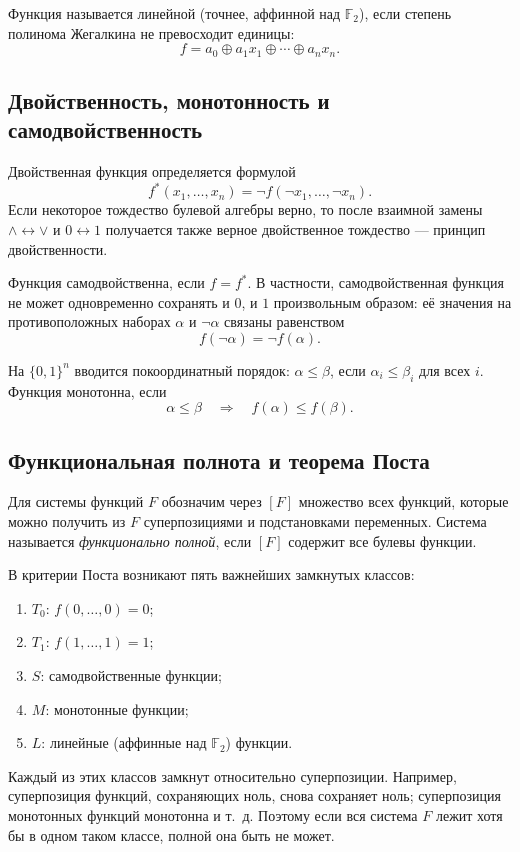 Функция называется линейной (точнее, аффинной над $\mathbb F_2$), если степень
полинома Жегалкина не превосходит единицы:
\[
 f=a_0\oplus a_1x_1\oplus\cdots\oplus a_nx_n.
\]

\subsection{Двойственность, монотонность и самодвойственность}

Двойственная функция определяется формулой
\[
 f^*(x_1,\ldots,x_n)=\neg f(\neg x_1,\ldots,\neg x_n).
\]
Если некоторое тождество булевой алгебры верно, то после взаимной замены
$\land\leftrightarrow\lor$ и $0\leftrightarrow1$ получается также верное
двойственное тождество --- принцип двойственности.

Функция самодвойственна, если $f=f^*$. В частности, самодвойственная функция не
может одновременно сохранять и $0$, и $1$ произвольным образом: её значения на
противоположных наборах $\alpha$ и $\neg\alpha$ связаны равенством
\[
 f(\neg\alpha)=\neg f(\alpha).
\]

На $\{0,1\}^n$ вводится покоординатный порядок:
$\alpha\le\beta$, если $\alpha_i\le\beta_i$ для всех $i$. Функция монотонна,
если
\[
 \alpha\le\beta\quad\Longrightarrow\quad f(\alpha)\le f(\beta).
\]

\subsection{Функциональная полнота и теорема Поста}

Для системы функций $F$ обозначим через $[F]$ множество всех функций, которые
можно получить из $F$ суперпозициями и подстановками переменных. Система
называется \emph{функционально полной}, если $[F]$ содержит все булевы функции.

В критерии Поста возникают пять важнейших замкнутых классов:
\begin{enumerate}
 \item $T_0$: $f(0,\ldots,0)=0$;
 \item $T_1$: $f(1,\ldots,1)=1$;
 \item $S$: самодвойственные функции;
 \item $M$: монотонные функции;
 \item $L$: линейные (аффинные над $\mathbb F_2$) функции.
\end{enumerate}
Каждый из этих классов замкнут относительно суперпозиции. Например, суперпозиция
функций, сохраняющих ноль, снова сохраняет ноль; суперпозиция монотонных функций
монотонна и т.~д. Поэтому если вся система $F$ лежит хотя бы в одном таком
классе, полной она быть не может.

